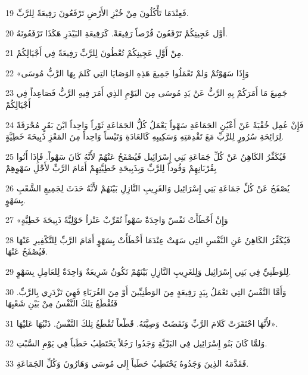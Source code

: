 \par 19 فَعِنْدَمَا تَأْكُلُونَ مِنْ خُبْزِ الأَرْضِ تَرْفَعُونَ رَفِيعَةً لِلرَّبِّ.
\par 20 أَوَّل عَجِينِكُمْ تَرْفَعُونَ قُرْصاً رَفِيعَةً. كَرَفِيعَةِ البَيْدَرِ هَكَذَا تَرْفَعُونَهُ.
\par 21 مِنْ أَوَّلِ عَجِينِكُمْ تُعْطُونَ لِلرَّبِّ رَفِيعَةً فِي أَجْيَالِكُمْ.
\par 22 «وَإِذَا سَهَوْتُمْ وَلمْ تَعْمَلُوا جَمِيعَ هَذِهِ الوَصَايَا التِي كَلمَ بِهَا الرَّبُّ مُوسَى
\par 23 جَمِيعَ مَا أَمَرَكُمْ بِهِ الرَّبُّ عَنْ يَدِ مُوسَى مِنَ اليَوْمِ الذِي أَمَرَ فِيهِ الرَّبُّ فَصَاعِداً فِي أَجْيَالِكُمْ
\par 24 فَإِنْ عُمِل خُفْيَةً عَنْ أَعْيُنِ الجَمَاعَةِ سَهْواً يَعْمَلُ كُلُّ الجَمَاعَةِ ثَوْراً وَاحِداً ابْنَ بَقَرٍ مُحْرَقَةً لِرَائِحَةِ سُرُورٍ لِلرَّبِّ مَعَ تَقْدِمَتِهِ وَسَكِيبِهِ كَالعَادَةِ وَتَيْساً وَاحِداً مِنَ المَعْزِ ذَبِيحَةَ خَطِيَّةٍ.
\par 25 فَيُكَفِّرُ الكَاهِنُ عَنْ كُلِّ جَمَاعَةِ بَنِي إِسْرَائِيل فَيُصْفَحُ عَنْهُمْ لأَنَّهُ كَانَ سَهْواً. فَإِذَا أَتُوا بِقُرْبَانِهِمْ وَقُوداً لِلرَّبِّ وَبِذَبِيحَةِ خَطِيَّتِهِمْ أَمَامَ الرَّبِّ لأَجْلِ سَهْوِهِمْ
\par 26 يُصْفَحُ عَنْ كُلِّ جَمَاعَةِ بَنِي إِسْرَائِيل وَالغَرِيبِ النَّازِلِ بَيْنَهُمْ لأَنَّهُ حَدَثَ لِجَمِيعِ الشَّعْبِ بِسَهْوٍ.
\par 27 «وَإِنْ أَخْطَأَتْ نَفْسٌ وَاحِدَةٌ سَهْواً تُقَرِّبْ عَنْزاً حَوْلِيَّةً ذَبِيحَةَ خَطِيَّةٍ
\par 28 فَيُكَفِّرُ الكَاهِنُ عَنِ النَّفْسِ التِي سَهَتْ عِنْدَمَا أَخْطَأَتْ بِسَهْوٍ أَمَامَ الرَّبِّ لِلتَّكْفِيرِ عَنْهَا فَيُصْفَحُ عَنْهَا.
\par 29 لِلوَطَنِيِّ فِي بَنِي إِسْرَائِيل وَلِلغَرِيبِ النَّازِلِ بَيْنَهُمْ تَكُونُ شَرِيعَةٌ وَاحِدَةٌ لِلعَامِلِ بِسَهْوٍ.
\par 30 وَأَمَّا النَّفْسُ التِي تَعْمَلُ بِيَدٍ رَفِيعَةٍ مِنَ الوَطَنِيِّينَ أَوْ مِنَ الغُرَبَاءِ فَهِيَ تَزْدَرِي بِالرَّبِّ. فَتُقْطَعُ تِلكَ النَّفْسُ مِنْ بَيْنِ شَعْبِهَا
\par 31 لأَنَّهَا احْتَقَرَتْ كَلامَ الرَّبِّ وَنَقَضَتْ وَصِيَّتَهُ. قَطْعاً تُقْطَعُ تِلكَ النَّفْسُ. ذَنْبُهَا عَليْهَا».
\par 32 وَلمَّا كَانَ بَنُو إِسْرَائِيل فِي البَرِّيَّةِ وَجَدُوا رَجُلاً يَحْتَطِبُ حَطَباً فِي يَوْمِ السَّبْتِ.
\par 33 فَقَدَّمَهُ الذِينَ وَجَدُوهُ يَحْتَطِبُ حَطَباً إِلى مُوسَى وَهَارُونَ وَكُلِّ الجَمَاعَةِ.
